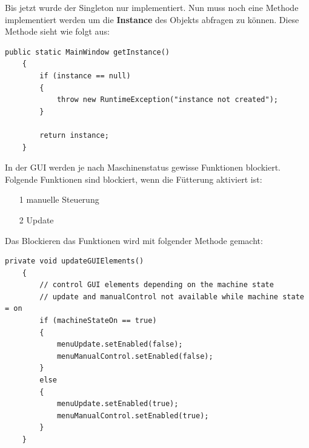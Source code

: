 Bis jetzt wurde der Singleton nur implementiert. Nun muss noch eine Methode implementiert werden um die \textbf{Instance} des Objekts abfragen zu können. Diese Methode sieht wie folgt aus:
\begin{lstlisting}[style=JavaStyle, caption=MainWindow.getInstance()]
public static MainWindow getInstance()
    {
        if (instance == null)
        {
            throw new RuntimeException("instance not created");
        }

        return instance;
    }
\end{lstlisting}

\vspace{10pt}

In der GUI werden je nach Maschinenstatus gewisse Funktionen blockiert. Folgende Funktionen sind blockiert, wenn die Fütterung aktiviert ist:
\begin{itemize}
\item[1] manuelle Steuerung
\item[2] Update
\end{itemize}
Das Blockieren das Funktionen wird mit folgender Methode gemacht:
\begin{lstlisting}[style=JavaStyle, caption=GUI Elemente blockieren]
private void updateGUIElements()
    {
        // control GUI elements depending on the machine state
        // update and manualControl not available while machine state = on 
        if (machineStateOn == true)
        {
            menuUpdate.setEnabled(false);
            menuManualControl.setEnabled(false);
        }
        else
        {
            menuUpdate.setEnabled(true);
            menuManualControl.setEnabled(true);
        }
    }
\end{lstlisting}

\newpage

